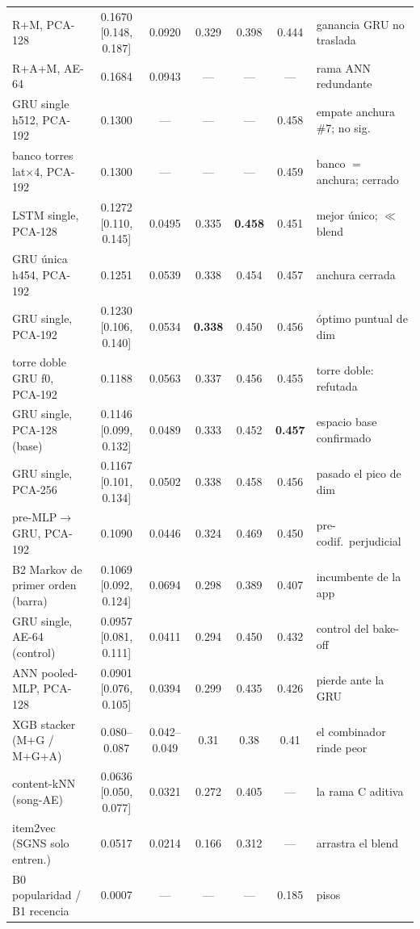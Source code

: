 \documentclass[11pt]{article}
\newcommand{\best}[1]{\textbf{#1}}
\begin{document}
\begin{table}[ht]
{\begin{tabular}{lcccccl}
    R+M, PCA-128                          & 0.1670 [0.148, 0.187] & 0.0920 & 0.329 & 0.398 & 0.444 & ganancia GRU no traslada \\
    R+A+M, AE-64                          & 0.1684 & 0.0943 & --- & --- & --- & rama ANN redundante \\
    GRU single h512, PCA-192          & 0.1300 & --- & --- & --- & 0.458 & empate anchura \#7; no sig.\ \\
    banco torres lat$\times$4, PCA-192 & 0.1300 & --- & --- & --- & 0.459 & banco $=$ anchura; cerrado \\
    LSTM single, PCA-128                  & 0.1272 [0.110, 0.145] & 0.0495 & 0.335 & \best{0.458} & 0.451 & mejor único; $\ll$ blend \\
    GRU única h454, PCA-192           & 0.1251 & 0.0539 & 0.338 & 0.454 & 0.457 & anchura cerrada \\
    GRU single, PCA-192                   & 0.1230 [0.106, 0.140] & 0.0534 & \best{0.338} & 0.450 & 0.456 & óptimo puntual de dim \\
    torre doble GRU f0, PCA-192       & 0.1188 & 0.0563 & 0.337 & 0.456 & 0.455 & torre doble: refutada \\
    GRU single, PCA-128 (base)            & 0.1146 [0.099, 0.132] & 0.0489 & 0.333 & 0.452 & \best{0.457} & espacio base confirmado \\
    GRU single, PCA-256                   & 0.1167 [0.101, 0.134] & 0.0502 & 0.338 & 0.458 & 0.456 & pasado el pico de dim \\
    pre-MLP$\to$GRU, PCA-192          & 0.1090 & 0.0446 & 0.324 & 0.469 & 0.450 & pre-codif.\ perjudicial \\
    B2 Markov de primer orden (barra)     & 0.1069 [0.092, 0.124] & 0.0694 & 0.298 & 0.389 & 0.407 & incumbente de la app \\
    GRU single, AE-64 (control)           & 0.0957 [0.081, 0.111] & 0.0411 & 0.294 & 0.450 & 0.432 & control del bake-off \\
    ANN pooled-MLP, PCA-128               & 0.0901 [0.076, 0.105] & 0.0394 & 0.299 & 0.435 & 0.426 & pierde ante la GRU \\
    XGB stacker (M+G / M+G+A)             & 0.080--0.087 & 0.042--0.049 & 0.31 & 0.38 & 0.41 & el combinador rinde peor \\
    content-kNN (song-AE)                 & 0.0636 [0.050, 0.077] & 0.0321 & 0.272 & 0.405 & --- & la rama C aditiva \\
    item2vec (SGNS solo entren.)          & 0.0517 & 0.0214 & 0.166 & 0.312 & --- & arrastra el blend \\
    B0 popularidad / B1 recencia          & 0.0007 & --- & --- & --- & 0.185 & pisos \\
    \bottomrule
  \end{tabular}}
\end{table}
\end{document}
